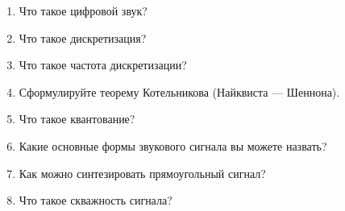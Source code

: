 \begin{enumerate}
\item Что такое цифровой звук?
\item Что такое дискретизация?
\item Что такое частота дискретизации?
\item Сформулируйте теорему Котельникова (Найквиста — Шеннона).
\item Что такое квантование?
\item Какие основные формы звукового сигнала вы можете назвать?
\item Как можно синтезировать прямоугольный сигнал?
\item Что такое скважность сигнала?
\end{enumerate}

